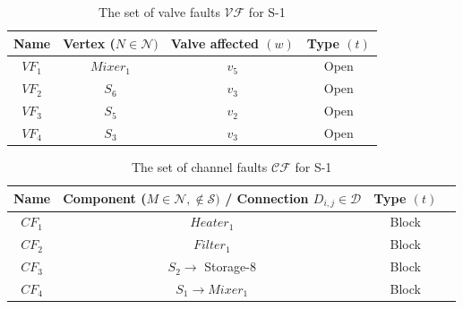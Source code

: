 \begin{table}[H]
\centering
\caption{The set of valve faults $\mathcal{VF}$ for S-1}
\begin{tabular}{| c | c | c | c |}
\hline
\textbf{Name} & \textbf{Vertex} ($N \in \mathcal{N})$ & \textbf{Valve affected} $(w)$ & \textbf{Type} $(t)$ \\ \hline
$VF_1$ & $Mixer_1$ & $v_5$ & Open \\ \hline
$VF_2$ & $S_6$ & $v_3$ & Open \\ \hline
$VF_3$ & $S_5$ & $v_2$ & Open \\ \hline
$VF_4$ & $S_3$ & $v_3$ & Open \\ \hline
\end{tabular}
\label{tab:s-1-vf}
\end{table}

\begin{table}[H]
\centering
\caption{The set of channel faults $\mathcal{CF}$ for S-1}
\begin{tabular}{| c | c | c | c |}
\hline
\textbf{Name} & \textbf{Component} ($M \in \mathcal{N}, \notin \mathcal{S})$ \textbf{/ Connection} $D_{i, j} \in \mathcal{D}$ & \textbf{Type} $(t)$ \\ \hline
$CF_1$ & $Heater_1$ & Block \\ \hline
$CF_2$ & $Filter_1$ & Block \\ \hline
$CF_3$ & $S_2 \rightarrow$ Storage-8 & Block \\ \hline
$CF_4$ & $S_1 \rightarrow Mixer_1$ & Block \\ \hline
\end{tabular}
\label{tab:s-1-cf}
\end{table}


